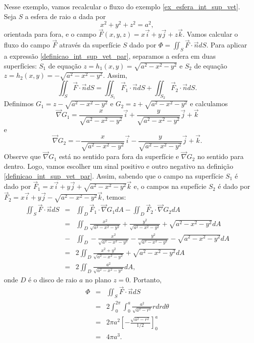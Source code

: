 \begin{ex}\label{ex_esfera_int_sup_vet_2}Nesse exemplo, vamos recalcular o fluxo do exemplo \ref{ex_esfera_int_sup_vet}. Seja $S$ a esfera de raio $a$ dada por 
$$
x^2+y^2+z^2=a^2,
$$
orientada para fora, e o campo $\vec{F}(x,y,z)=x\vec{i}+y\vec{j}+z\vec{k}$. Vamos calcular o fluxo do campo $\vec{F}$ através da superfície $S$ dado por $\Phi=\iint_S \vec{F}\cdot\vec{n} d S $. Para aplicar a expressão \eqref{definicao_int_sup_vet_par}, separamos a esfera em duas superfícies: $S_1$ de equação $z=h_1(x,y)=\sqrt{a^2-x^2-y^2}$ e $S_2$ de equação $z=h_2(x,y)=-\sqrt{a^2-x^2-y^2}$. Assim,
\begin{equation*}
\iint_S \vec{F}\cdot\vec{n} d S=  \iint_{S_1} \vec{F}_1\cdot\vec{n} d S+\iint_{S_2} \vec{F}_2\cdot\vec{n} d S.
\end{equation*}
Definimos $G_1=z-\sqrt{a^2-x^2-y^2}$ e $G_2=z+\sqrt{a^2-x^2-y^2}$ e calculamos
$$
\vec{\nabla}G_1=\frac{x}{\sqrt{a^2-x^2-y^2}}\vec{i}+\frac{y}{\sqrt{a^2-x^2-y^2}}\vec{j}+\vec{k}
$$
e 
$$
\vec{\nabla}G_2=-\frac{x}{\sqrt{a^2-x^2-y^2}}\vec{i}-\frac{y}{\sqrt{a^2-x^2-y^2}}\vec{j}+\vec{k}.
$$
Observe que $\vec{\nabla}G_1$ está no sentido para fora da superfície e $\vec{\nabla}G_2$ no sentido para dentro. Logo, vamos escolher um sinal positivo e outro negativo na definição \eqref{definicao_int_sup_vet_par}.
Assim, sabendo que o campo na superfície $S_1$ é dado por $\vec{F}_1=x\vec{i}+y\vec{j}+\sqrt{a^2-x^2-y^2}\vec{k}$ e, o campos na supefície $S_2$ é dado por $\vec{F}_2=x\vec{i}+y\vec{j}-\sqrt{a^2-x^2-y^2}\vec{k}$, temos:
\begin{eqnarray*}
\iint_S \vec{F}\cdot\vec{n} d S&=&  \iint_{D} \vec{F}_1\cdot \vec{\nabla}G_1 d A-\iint_{D} \vec{F}_2\cdot\vec{\nabla}G_2 d A\\
&=&  \iint_{D} \frac{x^2}{\sqrt{a^2-x^2-y^2}}+\frac{y^2}{\sqrt{a^2-x^2-y^2}}+\sqrt{a^2-x^2-y^2} d A\\&-&\iint_{D} -\frac{x^2}{\sqrt{a^2-x^2-y^2}}-\frac{y^2}{\sqrt{a^2-x^2-y^2}}-\sqrt{a^2-x^2-y^2} d A\\
&=&  2\iint_{D} \frac{x^2+y^2}{\sqrt{a^2-x^2-y^2}}+\sqrt{a^2-x^2-y^2} d A\\
&=&  2\iint_{D} \frac{a^2}{\sqrt{a^2-x^2-y^2}} d A,
\end{eqnarray*}
onde $D$ é o disco de raio $a$ no plano $z=0$. Portanto,
\begin{eqnarray*}
\Phi&=& \iint_S \vec{F}\cdot\vec{n} d S\\
&=&  2\int_0^{2\pi }\int_{0}^a\frac{a^2}{\sqrt{a^2-r^2}} rdrd\theta\\
&=&  2\pi a^2\left[ -\frac{\sqrt{a^2-r^2}}{1/2} \right]_{0}^a\\
&=&  4\pi a^3. 
\end{eqnarray*}


\end{ex}

